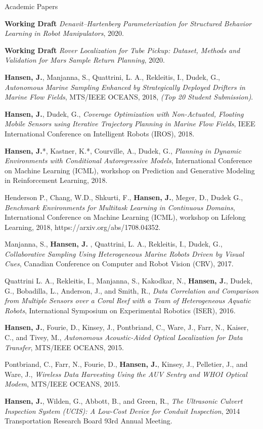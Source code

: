 \documentclass{resume} %
\begin{document}
\begin{rSection}{Academic Papers}

\textbf{Working Draft} \textit{Denavit–Hartenberg Parameterization for Structured Behavior Learning in Robot Manipulators}, 2020.

\textbf{Working Draft} \textit{Rover Localization for Tube Pickup: Dataset, Methods and Validation for Mars Sample Return Planning}, 2020.

%

\textbf{Hansen, J.}, Manjanna, S.,  Quattrini, L. A., Rekleitis, I., Dudek, G., \textit{Autonomous Marine Sampling Enhanced by Strategically Deployed Drifters in Marine Flow Fields}, MTS/IEEE OCEANS, 2018, \emph{{(Top 20 Student Submission)}}.

\textbf{Hansen, J.}, Dudek, G., \textit{Coverage Optimization with Non-Actuated, Floating Mobile Sensors using Iterative Trajectory Planning in Marine Flow Fields}, IEEE International Conference on Intelligent Robots (IROS), 2018.

\textbf{Hansen, J.}*, Kastner, K.*, Courville, A., Dudek, G.,  \textit{Planning in Dynamic Environments with Conditional Autoregressive Models}, International Conference on Machine Learning (ICML), workshop on Prediction and Generative Modeling in Reinforcement Learning, 2018.

Henderson P., Chang, W.D., Shkurti, F., \textbf{Hansen, J.}, Meger, D., Dudek G., 
\textit{Benchmark Environments for Multitask Learning in Continuous Domains}, International Conference on Machine Learning (ICML), workshop on Lifelong Learning, 2018, https://arxiv.org/abs/1708.04352. 

Manjanna, S., \textbf{ Hansen, J. }, Quattrini, L. A., Rekleitis, I., Dudek, G., 
\textit{Collaborative Sampling Using Heterogeneous Marine Robots Driven by Visual Cues}, Canadian Conference on Computer and Robot Vision (CRV), 2017. 
                
Quattrini L. A., Rekleitis, I., Manjanna, S., Kakodkar, N., \textbf{Hansen, J.},   Dudek, G.,  Bobadilla, L.,  Anderson, J., and Smith, R.,
            \textit{Data Correlation and Comparison from Multiple Sensors over a Coral Reef with a Team of Heterogeneous Aquatic Robots},
             International Symposium on Experimental Robotics (ISER),
              2016.

\textbf{Hansen, J.}, Fourie, D., Kinsey, J., Pontbriand, C., Ware, J., Farr, N., Kaiser, C., and Tivey, M., \textit{Autonomous Acoustic-Aided Optical Localization for Data Transfer}, MTS/IEEE OCEANS, 2015.

Pontbriand, C., Farr, N., Fourie, D., \textbf{Hansen, J.},  Kinsey, J., Pelletier, J., and Ware, J., 
 \textit{Wireless Data Harvesting Using the AUV Sentry and WHOI Optical Modem}, MTS/IEEE OCEANS, 2015.

\textbf{Hansen, J.}, Wilden, G., Abbott, B., and Green, R., \textit{The Ultrasonic Culvert
Inspection System (UCIS): A Low-Cost Device for Conduit Inspection}, 2014 Transportation
Research Board 93rd Annual Meeting. 
\end{rSection}
\end{document}
